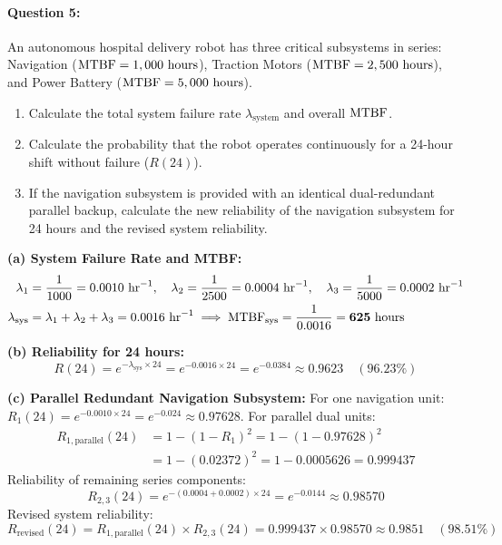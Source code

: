 \paragraph{Question 5:} An autonomous hospital delivery robot has three critical subsystems in series: Navigation ($\text{MTBF} = 1,000\text{ hours}$), Traction Motors ($\text{MTBF} = 2,500\text{ hours}$), and Power Battery ($\text{MTBF} = 5,000\text{ hours}$).
\begin{enumerate}[label=(\alph*), itemsep=1pt]
    \item Calculate the total system failure rate $\lambda_{\text{system}}$ and overall $\text{MTBF}$.
    \item Calculate the probability that the robot operates continuously for a 24-hour shift without failure ($R(24)$).
    \item If the navigation subsystem is provided with an identical dual-redundant parallel backup, calculate the new reliability of the navigation subsystem for 24 hours and the revised system reliability.
\end{enumerate}
\vspace{0.3em}
\begin{tcolorbox}[colback=white,colframe=seSecondary,title={\small \textbf{Model Solution to Question 5:}}]
\textbf{(a) System Failure Rate and MTBF:}
\begin{align}
    \lambda_1 &= \frac{1}{1000} = 0.0010\text{ hr}^{-1}, \quad \lambda_2 = \frac{1}{2500} = 0.0004\text{ hr}^{-1}, \quad \lambda_3 = \frac{1}{5000} = 0.0002\text{ hr}^{-1} \notag \\
    \lambda_{\text{sys}} &= \lambda_1 + \lambda_2 + \lambda_3 = 0.0016\text{ hr}^{-1} \implies \text{MTBF}_{\text{sys}} = \frac{1}{0.0016} = \mathbf{625\text{ hours}}
\end{align}

\textbf{(b) Reliability for 24 hours:}
\begin{equation}
    R(24) = e^{-\lambda_{\text{sys}} \times 24} = e^{-0.0016 \times 24} = e^{-0.0384} \approx \mathbf{0.9623 \quad (96.23\%)}
\end{equation}

\textbf{(c) Parallel Redundant Navigation Subsystem:}
For one navigation unit: $R_1(24) = e^{-0.0010 \times 24} = e^{-0.024} \approx 0.97628$.
For parallel dual units:
\begin{equation}
\begin{aligned}
    R_{1,\text{parallel}}(24) &= 1 - (1 - R_1)^2 = 1 - (1 - 0.97628)^2 \\
    &= 1 - (0.02372)^2 = 1 - 0.0005626 = \mathbf{0.999437}
\end{aligned}
\end{equation}
Reliability of remaining series components:
\begin{equation}
    R_{2,3}(24) = e^{-(0.0004 + 0.0002) \times 24} = e^{-0.0144} \approx 0.98570
\end{equation}
Revised system reliability:
\begin{equation}
    R_{\text{revised}}(24) = R_{1,\text{parallel}}(24) \times R_{2,3}(24) = 0.999437 \times 0.98570 \approx \mathbf{0.9851 \quad (98.51\%)}
\end{equation}
\end{tcolorbox}

